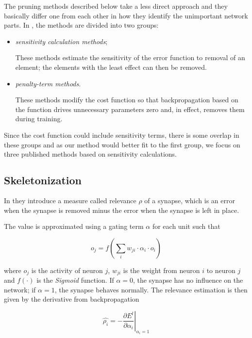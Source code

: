 The pruning methods described below take a less direct approach and they basically differ one from each other in how they identify the unimportant network parts. In \citep{reed:pa_survey}, the methods are divided into two groups:
\begin{itemize}
\item \textit{sensitivity calculation methods};

These methods estimate the sensitivity of the error function to removal of an element; the elements with the least effect can then be removed.
 
\item \textit{penalty-term methods}.

These methods modify the cost function so that backpropagation based on the function drives unnecessary parameters zero and, in effect, removes them during training.
\end{itemize}

Since the cost function could include sensitivity terms, there is some overlap in these groups and as our method would better fit to the first group, we focus on three published methods based on sensitivity calculations.

\subsection*{Skeletonization} \label{ssec:skeletonization}
In \citep{mozer:skeletonization} they introduce a measure called relevance $ \rho $ of a synapse, which is an error when the synapse is removed minus the error when the synapse is left in place.

The value is approximated using a gating term $ \alpha $ for each unit such that

\begin{equation}
o_j = f(\displaystyle{\sum_i w_{ji} \cdot \alpha_i \cdot o_i})
\end{equation}

where $ o_j $ is the activity of neuron $ j $, $ w_{ji} $ is the weight from neuron $ i $ to neuron $ j $ and $ f(\cdot) $ is the \textit{Sigmoid} function. If $ \alpha = 0 $, the synapse has no influence on the network; if $ \alpha = 1 $, the synapse behaves normally. The relevance estimation is then given by the derivative from backpropagation

\begin{equation}
\hat{\rho_i} = - \left.\frac{\partial E^l}{\partial \alpha_i}\right\rvert_{\alpha_i = 1}
\end{equation}

